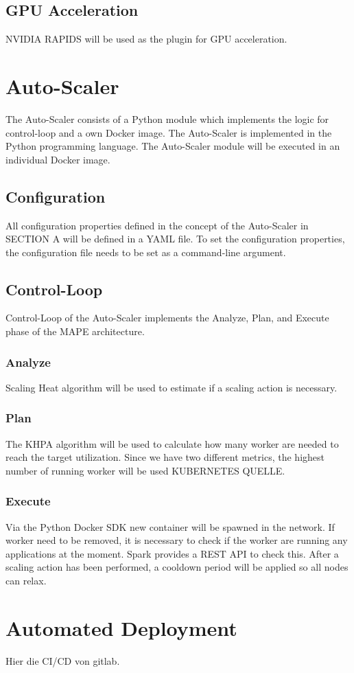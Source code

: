 \subsection{GPU Acceleration}

NVIDIA RAPIDS will be used as the plugin for GPU acceleration.



\section{Auto-Scaler}
The Auto-Scaler consists of a Python module which implements the logic for control-loop and a own Docker image.
The Auto-Scaler is implemented in the Python programming language.
The Auto-Scaler module will be executed in an individual Docker image.

\subsection{Configuration}
All configuration properties defined in the concept of the Auto-Scaler in SECTION A will be defined in a YAML file.
To set the configuration properties, the configuration file needs to be set as a command-line argument.

\subsection{Control-Loop}
Control-Loop of the Auto-Scaler implements the Analyze, Plan, and Execute phase of the MAPE architecture.

\subsubsection{Analyze}
Scaling Heat algorithm will be used to estimate if a scaling action is necessary.

\subsubsection{Plan}
The KHPA algorithm will be used to calculate how many worker are needed to reach the target utilization. Since we have two different metrics, the highest number of running worker will be used KUBERNETES QUELLE.

\subsubsection{Execute}
Via the Python Docker SDK new container will be spawned in the network.
If worker need to be removed, it is necessary to check if the worker are running any applications at the moment. Spark provides a REST API to check this.
After a scaling action has been performed, a cooldown period will be applied so all nodes can relax.



\section{Automated Deployment}
Hier die CI/CD von gitlab.
